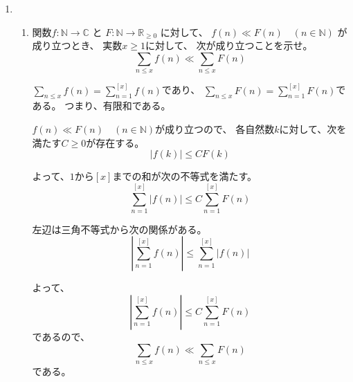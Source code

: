 \documentclass[12pt,b5paper]{ltjsarticle}
\begin{document}
\hrulefill

\begin{enumerate}
 \item
      \begin{enumerate}
       \item
            関数$f:\mathbb{N}\to\mathbb{C}$
            と
            $F:\mathbb{N}\to\mathbb{R}_{\geq 0}$
            に対して、
            $f(n) \ll F(n) \quad (n\in\mathbb{N})$
            が成り立つとき、
            実数$x\geq 1$に対して、
            次が成り立つことを示せ。
            \begin{equation}
             \sum_{n\leq x} f(n) \ll \sum_{n\leq x} F(n)
            \end{equation}

            \dotfill

            $\sum_{n\leq x} f(n) = \sum_{n=1}^{[x]} f(n)$であり、
            $\sum_{n\leq x} F(n) = \sum_{n=1}^{[x]} F(n)$である。
            つまり、有限和である。


            $f(n) \ll F(n) \quad (n\in\mathbb{N})$が成り立つので、
            各自然数$k$に対して、次を満たす$C\geq0$が存在する。
            \begin{equation}
             \lvert f(k) \rvert \leq C F(k)
            \end{equation}

            よって、$1$から$[x]$までの和が次の不等式を満たす。
            \begin{equation}
              \sum_{n=1}^{[x]} \left\lvert f(n) \right\rvert
               \leq C\sum_{n=1}^{[x]} F(n)
            \end{equation}

            左辺は三角不等式から次の関係がある。
            \begin{equation}
              \left\lvert \sum_{n=1}^{[x]} f(n) \right\rvert
              \leq
              \sum_{n=1}^{[x]} \left\lvert f(n) \right\rvert
            \end{equation}

            よって、
            \begin{equation}
             \left\lvert \sum_{n=1}^{[x]} f(n) \right\rvert
               \leq C\sum_{n=1}^{[x]} F(n)
            \end{equation}
            であるので、
            \begin{equation}
             \sum_{n\leq x} f(n) \ll \sum_{n\leq x} F(n)
            \end{equation}
            である。






\end{enumerate}
\end{enumerate}
\end{document}
